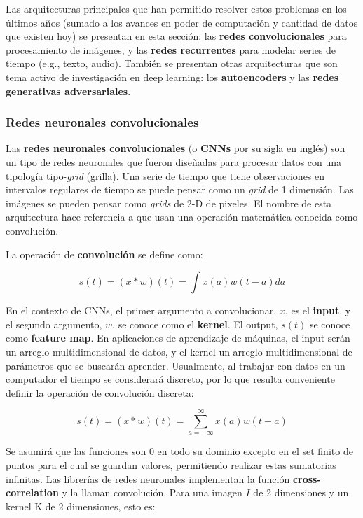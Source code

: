 Las arquitecturas principales que han permitido resolver estos problemas en los \'ultimos a{\~{n}}os (sumado a los avances en poder de computaci\'on y cantidad de datos que existen hoy) se presentan en esta secci\'on: las \textbf{redes convolucionales} para procesamiento de im\'agenes, y las \textbf{redes recurrentes} para modelar series de tiempo (e.g., texto, audio). Tambi\'en se presentan otras arquitecturas que son tema activo de investigaci\'on en deep learning: los \textbf{autoencoders} y las \textbf{redes generativas adversariales}.

\subsubsection{Redes neuronales convolucionales}

Las \textbf{redes neuronales convolucionales} (o \textbf{CNNs} por su sigla en inglés) son un tipo de redes neuronales que fueron dise{\~{n}}adas para procesar datos con una tipolog\'ia tipo-\textit{grid} (grilla). Una serie de tiempo que tiene observaciones en intervalos regulares de tiempo se puede pensar como un \textit{grid} de 1 dimensi\'on. Las im\'agenes se pueden pensar como \textit{grids} de 2-D de pixeles. El nombre de esta arquitectura hace referencia a que usan una operaci\'on matem\'atica conocida como convoluci\'on.

La operaci\'on de \textbf{convoluci\'on} se define como:

\begin{equation}
s(t) = (x * w)(t) = \int x(a)w(t-a)da
\end{equation}

En el contexto de CNNs, el primer argumento a convolucionar, $x$, es el \textbf{input}, y el segundo argumento, $w$, se conoce como el \textbf{kernel}. El output, $s(t)$ se conoce como \textbf{feature map}. En aplicaciones de aprendizaje de m\'aquinas, el input ser\'an un arreglo multidimensional de datos, y el kernel un arreglo multidimensional de par\'ametros que se buscar\'an aprender. Usualmente, al trabajar con datos en un computador el tiempo se considerar\'a discreto, por lo que resulta conveniente definir la operaci\'on de convoluci\'on discreta:

\begin{equation}
s(t) = (x * w)(t) = \sum_{a=-\infty}^{\infty} x(a)w(t-a)
\end{equation}

Se asumir\'a que las funciones son 0 en todo su dominio excepto en el set finito de puntos para el cual se guardan valores, permitiendo realizar estas sumatorias infinitas. Las librer\'ias de redes neuronales implementan la funci\'on \textbf{cross-correlation} y la llaman convoluci\'on. Para una imagen $I$ de 2 dimensiones y un kernel K de 2 dimensiones, esto es: 

